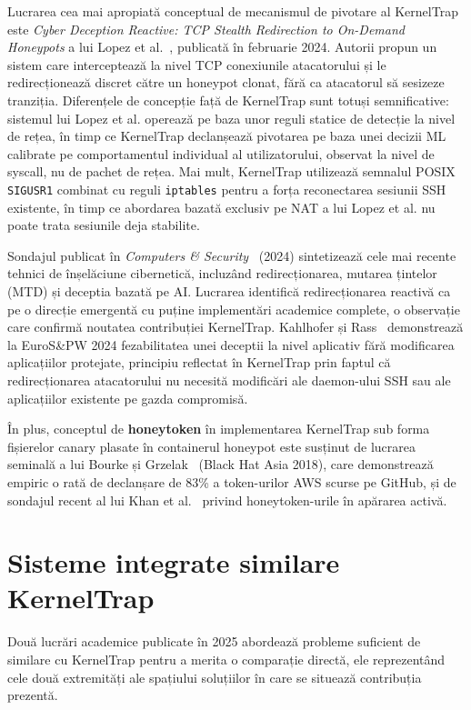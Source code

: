 Lucrarea cea mai apropiată conceptual de mecanismul de pivotare al KernelTrap
este \textit{Cyber Deception Reactive: TCP Stealth Redirection to On-Demand
Honeypots} a lui Lopez et al.~\cite{lopez2024tcpredirection}, publicată în
februarie 2024.
Autorii propun un sistem care interceptează la nivel TCP conexiunile
atacatorului și le redirecționează discret către un honeypot clonat, fără ca
atacatorul să sesizeze tranziția.
Diferențele de concepție față de KernelTrap sunt totuși semnificative: sistemul
lui Lopez et al. operează pe baza unor reguli statice de detecție la nivel de
rețea, în timp ce KernelTrap declanșează pivotarea pe baza unei decizii ML
calibrate pe comportamentul individual al utilizatorului, observat la nivel de
syscall, nu de pachet de rețea.
Mai mult, KernelTrap utilizează semnalul POSIX \texttt{SIGUSR1} combinat cu
reguli \texttt{iptables} pentru a forța reconectarea sesiunii SSH existente, în
timp ce abordarea bazată exclusiv pe NAT a lui Lopez et al. nu poate trata
sesiunile deja stabilite.

Sondajul publicat în \textit{Computers \& Security}~\cite{deceptionsurvey2024}
(2024) sintetizează cele mai recente tehnici de înșelăciune cibernetică,
incluzând redirecționarea, mutarea țintelor (MTD) și deceptia bazată pe AI.
Lucrarea identifică redirecționarea reactivă ca pe o direcție emergentă cu
puține implementări academice complete, o observație care confirmă noutatea
contribuției KernelTrap.
Kahlhofer și Rass~\cite{kahlhofer2024applayer} demonstrează la EuroS\&PW 2024
fezabilitatea unei deceptii la nivel aplicativ fără modificarea aplicațiilor
protejate, principiu reflectat în KernelTrap prin faptul că redirecționarea
atacatorului nu necesită modificări ale daemon-ului SSH sau ale aplicațiilor
existente pe gazda compromisă.

În plus, conceptul de \textbf{honeytoken} în implementarea KernelTrap sub
forma fișierelor canary plasate în containerul honeypot este susținut de
lucrarea seminală a lui Bourke și Grzelak~\cite{bourke2018awstokens} (Black Hat
Asia 2018), care demonstrează empiric o rată de declanșare de 83\% a
token-urilor AWS scurse pe GitHub, și de sondajul recent al lui Khan et
al.~\cite{honeytokenssurvey2024} privind honeytoken-urile în apărarea activă.

\section{Sisteme integrate similare KernelTrap}

Două lucrări academice publicate în 2025 abordează probleme suficient de
similare cu KernelTrap pentru a merita o comparație directă, ele reprezentând
cele două extremități ale spațiului soluțiilor în care se situează contribuția
prezentă.

